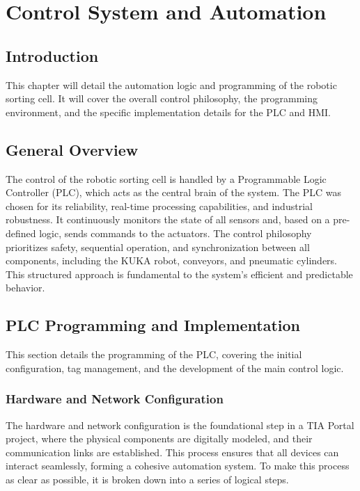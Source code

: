 \chapter{Control System and Automation}

\section{Introduction}
This chapter will detail the automation logic and programming of the robotic sorting cell. It will cover the overall control philosophy, the programming environment, and the specific implementation details for the PLC and HMI.

\section{General Overview}
The control of the robotic sorting cell is handled by a Programmable Logic Controller (PLC), which acts as the central brain of the system. The PLC was chosen for its reliability, real-time processing capabilities, and industrial robustness. It continuously monitors the state of all sensors and, based on a pre-defined logic, sends commands to the actuators. The control philosophy prioritizes safety, sequential operation, and synchronization between all components, including the KUKA robot, conveyors, and pneumatic cylinders. This structured approach is fundamental to the system's efficient and predictable behavior.


\section{PLC Programming and Implementation}
This section details the programming of the PLC, covering the initial configuration, tag management, and the development of the main control logic.

\subsection{Hardware and Network Configuration}
The hardware and network configuration is the foundational step in a TIA Portal project, where the physical components are digitally modeled, and their communication links are established. This process ensures that all devices can interact seamlessly, forming a cohesive automation system. To make this process as clear as possible, it is broken down into a series of logical steps.

